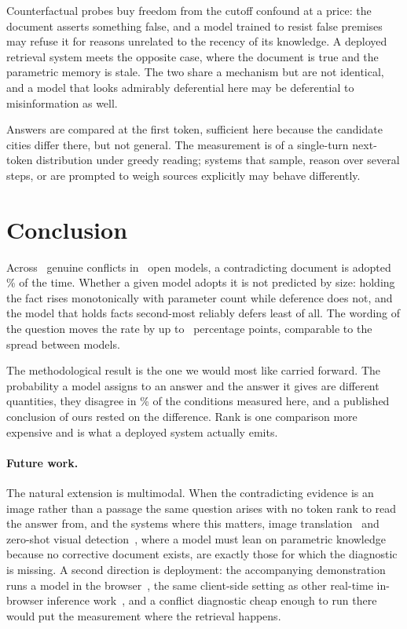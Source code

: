 \documentclass{article}
\begin{document}
Counterfactual probes buy freedom from the cutoff confound at a price: the
document asserts something false, and a model trained to resist false premises
may refuse it for reasons unrelated to the recency of its knowledge. A deployed
retrieval system meets the opposite case, where the document is true and the
parametric memory is stale. The two share a mechanism but are not identical, and
a model that looks admirably deferential here may be deferential to
misinformation as well.

Answers are compared at the first token, sufficient here because the candidate
cities differ there, but not general. The measurement is of a single-turn
next-token distribution under greedy reading; systems that sample, reason over
several steps, or are prompted to weigh sources explicitly may behave
differently.

\section{Conclusion}

Across \NConflict\ genuine conflicts in \NModels\ open models, a contradicting
document is adopted \AdoptConflict\% of the time. Whether a given model adopts it
is not predicted by size: holding the fact rises monotonically with parameter
count while deference does not, and the model that holds facts second-most
reliably defers least of all. The wording of the question moves the rate by up to
\MaxPhrasingSpread\ percentage points, comparable to the spread between models.

The methodological result is the one we would most like carried forward. The
probability a model assigns to an answer and the answer it gives are different
quantities, they disagree in \ProbOverTenNotTopPct\% of the conditions measured
here, and a published conclusion of ours rested on the difference. Rank is one
comparison more expensive and is what a deployed system actually emits.

\paragraph{Future work.} The natural extension is multimodal. When the
contradicting evidence is an image rather than a passage the same question
arises with no token rank to read the answer from, and the systems where this
matters, image translation~\citep{thakur2021whitebox, thakur2021aoda} and
zero-shot visual detection~\citep{thakur2026accident}, where a model must lean on
parametric knowledge because no corrective document exists, are exactly those for
which the diagnostic is missing. A second direction is deployment: the
accompanying demonstration runs a model in the
browser~\citep{thakur2026demo}, the same client-side setting as other real-time
in-browser inference work~\citep{thakur2026gesture}, and a conflict diagnostic
cheap enough to run there would put the measurement where the retrieval happens.
\end{document}
